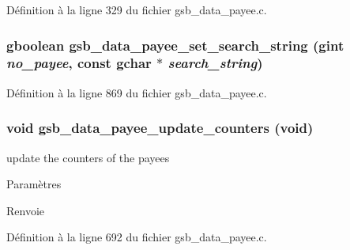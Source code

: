 Définition à la ligne 329 du fichier gsb\_\-data\_\-payee.c.

\subsubsection[{gsb\_\-data\_\-payee\_\-set\_\-search\_\-string}]{\setlength{\rightskip}{0pt plus 5cm}gboolean gsb\_\-data\_\-payee\_\-set\_\-search\_\-string (gint {\em no\_\-payee}, \/  const gchar $\ast$ {\em search\_\-string})}\label{gsb__data__payee_8h_a8347c14ccb3747b1b38bb6a9ef05719f}


Définition à la ligne 869 du fichier gsb\_\-data\_\-payee.c.

\subsubsection[{gsb\_\-data\_\-payee\_\-update\_\-counters}]{\setlength{\rightskip}{0pt plus 5cm}void gsb\_\-data\_\-payee\_\-update\_\-counters (void)}\label{gsb__data__payee_8h_a73abbe0b5d9a480fbff94cc2517d5982}
update the counters of the payees


\begin{DoxyParams}{Paramètres}
\item[{\em }]\end{DoxyParams}
\begin{DoxyReturn}{Renvoie}

\end{DoxyReturn}


Définition à la ligne 692 du fichier gsb\_\-data\_\-payee.c.

